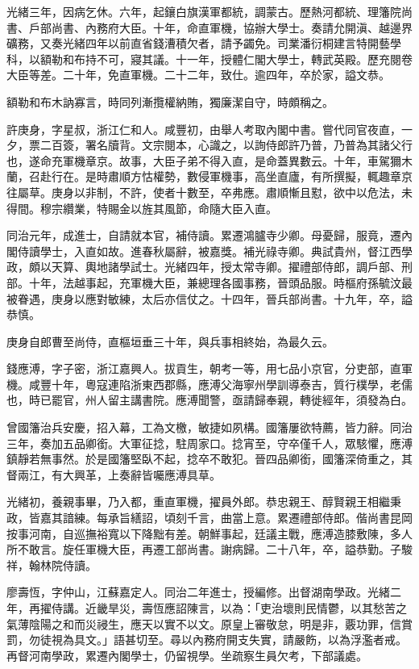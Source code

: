 \begin{pinyinscope}
光緒三年，因病乞休。六年，起鑲白旗漢軍都統，調蒙古。歷熱河都統、理籓院尚書、戶部尚書、內務府大臣。十年，命直軍機，協辦大學士。奏請允開滇、越邊界礦務，又奏光緒四年以前直省錢漕積欠者，請予蠲免。司業潘衍桐建言特開藝學科，以額勒和布持不可，寢其議。十一年，授體仁閣大學士，轉武英殿。歷充閱卷大臣等差。二十年，免直軍機。二十二年，致仕。逾四年，卒於家，謚文恭。

額勒和布木訥寡言，時同列漸攬權納賄，獨廉潔自守，時頗稱之。

許庚身，字星叔，浙江仁和人。咸豐初，由舉人考取內閣中書。嘗代同官夜直，一夕，票二百簽，署名牘背。文宗閱本，心識之，以詢侍郎許乃普，乃普為其諸父行也，遂命充軍機章京。故事，大臣子弟不得入直，是命蓋異數云。十年，車駕獮木蘭，召赴行在。是時肅順方怙權勢，數侵軍機事，高坐直廬，有所撰擬，輒趣章京往屬草。庚身以非制，不許，使者十數至，卒弗應。肅順慚且懟，欲中以危法，未得間。穆宗纘業，特賜金以旌其風節，命隨大臣入直。

同治元年，成進士，自請就本官，補侍讀。累遷鴻臚寺少卿。母憂歸，服竟，遷內閣侍讀學士，入直如故。進春秋屬辭，被嘉獎。補光祿寺卿。典試貴州，督江西學政，頗以天算、輿地諸學試士。光緒四年，授太常寺卿。擢禮部侍郎，調戶部、刑部。十年，法越事起，充軍機大臣，兼總理各國事務，晉頭品服。時樞府孫毓汶最被眷遇，庚身以應對敏練，太后亦信仗之。十四年，晉兵部尚書。十九年，卒，謚恭慎。

庚身自郎曹至尚侍，直樞垣垂三十年，與兵事相終始，為最久云。

錢應溥，字子密，浙江嘉興人。拔貢生，朝考一等，用七品小京官，分吏部，直軍機。咸豐十年，粵寇連陷浙東西郡縣，應溥父海寧州學訓導泰吉，質行樸學，老儒也，時已罷官，州人留主講書院。應溥聞警，亟請歸奉親，轉徙經年，須發為白。

曾國籓治兵安慶，招入幕，工為文檄，敏捷如夙構。國籓屢欲特薦，皆力辭。同治三年，奏加五品卿銜。大軍征捻，駐周家口。捻宵至，守卒僅千人，眾駭懼，應溥鎮靜若無事然。於是國籓堅臥不起，捻卒不敢犯。晉四品卿銜，國籓深倚重之，其督兩江，有大興革，上奏辭皆囑應溥具草。

光緒初，養親事畢，乃入都，重直軍機，擢員外郎。恭忠親王、醇賢親王相繼秉政，皆嘉其諳練。每承旨繕詔，頃刻千言，曲當上意。累遷禮部侍郎。偕尚書昆岡按事河南，自巡撫裕寬以下降黜有差。朝鮮事起，廷議主戰，應溥造膝敷陳，多人所不敢言。旋任軍機大臣，再遷工部尚書。謝病歸。二十八年，卒，謚恭勤。子駿祥，翰林院侍讀。

廖壽恆，字仲山，江蘇嘉定人。同治二年進士，授編修。出督湖南學政。光緒二年，再擢侍講。近畿旱災，壽恆應詔陳言，以為：「吏治壞則民情鬱，以其愁苦之氣薄陰陽之和而災祲生，應天以實不以文。原皇上審敬怠，明是非，覈功罪，信賞罰，勿徒視為具文。」語甚切至。尋以內務府開支失實，請嚴飭，以為浮濫者戒。再督河南學政，累遷內閣學士，仍留視學。坐疏察生員欠考，下部議處。


\end{pinyinscope}
